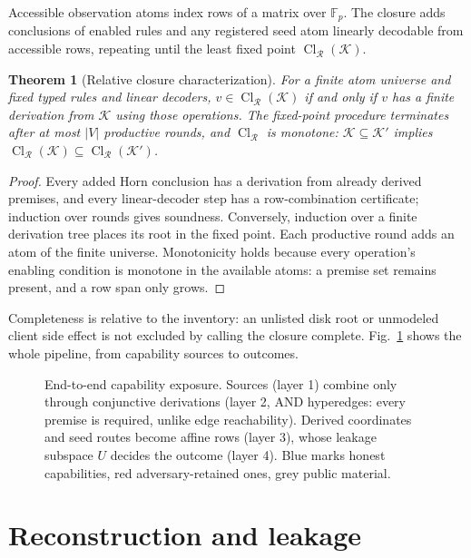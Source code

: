 \documentclass[pdflatex,sn-mathphys-num,twocolumn]{sn-jnl}
\theoremstyle{plain}
\newtheorem{theorem}{Theorem}
\theoremstyle{definition}
\newcommand{\Cl}{\operatorname{Cl}}
\newcommand{\F}{\mathbb{F}}
\begin{document}
Accessible observation atoms index rows of a matrix over $\F_p$. The closure adds conclusions of enabled rules and any registered seed atom linearly decodable from accessible rows, repeating until the least fixed point $\Cl_{\mathcal R}(\mathcal K)$.

\begin{theorem}[Relative closure characterization]\label{thm:closure}
For a finite atom universe and fixed typed rules and linear decoders, $v\in\Cl_{\mathcal R}(\mathcal K)$ if and only if $v$ has a finite derivation from $\mathcal K$ using those operations. The fixed-point procedure terminates after at most $|V|$ productive rounds, and $\Cl_{\mathcal R}$ is monotone: $\mathcal K\subseteq \mathcal K'$ implies $\Cl_{\mathcal R}(\mathcal K)\subseteq\Cl_{\mathcal R}(\mathcal K')$.
\end{theorem}
\begin{proof}
Every added Horn conclusion has a derivation from already derived premises, and every linear-decoder step has a row-combination certificate; induction over rounds gives soundness. Conversely, induction over a finite derivation tree places its root in the fixed point. Each productive round adds an atom of the finite universe. Monotonicity holds because every operation's enabling condition is monotone in the available atoms: a premise set remains present, and a row span only grows.
\end{proof}

Completeness is relative to the inventory: an unlisted disk root or unmodeled client side effect is not excluded by calling the closure complete. Fig.~\ref{fig:capabilities} shows the whole pipeline, from capability sources to outcomes.

\begin{figure}[t]
\centering
\resizebox{\linewidth}{!}{}
\caption{End-to-end capability exposure. Sources (layer 1) combine only through conjunctive derivations (layer 2, AND hyperedges: every premise is required, unlike edge reachability). Derived coordinates and seed routes become affine rows (layer 3), whose leakage subspace $U$ decides the outcome (layer 4). Blue marks honest capabilities, red adversary-retained ones, grey public material.}\label{fig:capabilities}
\end{figure}


\section{Reconstruction and leakage}\label{sec:leakage}
\end{document}
